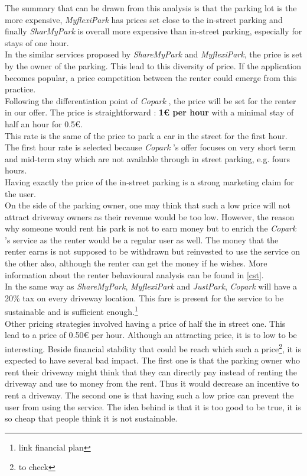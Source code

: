 \documentclass[12pt,a4paper,oneside]{book}
\newcommand{\bp}{\textit{Copark }}
\begin{document}
The summary that can be drawn from this analysis is that the parking lot is the more expensive, \textit{MyflexiPark} has prices set close to the in-street parking and finally \textit{SharMyPark} is overall more expensive than in-street parking, especially for stays of one hour.\\

In the similar services proposed by \textit{ShareMyPark} and \textit{MyflexiPark}, the price is set by the owner of the parking. This lead to this diversity of price. If the application becomes popular, a price competition between the renter could emerge from this practice.\\

Following the differentiation point of \bp, the price will be set for the renter in our offer. The price is straightforward : \textbf{1\euro{} per hour} with a minimal stay of half an hour for 0.5\euro{}.\\
This rate is the same of the price to park a car in the street for the first hour. The first hour rate is selected because \bp's offer focuses on very short term and mid-term stay which are not available through in street parking, e.g. fours hours.\\
Having exactly the price of the in-street parking is a strong marketing claim for the user.\\

On the side of the parking owner, one may think that such a low price will not attract driveway owners as their revenue would be too low. However, the reason why someone would rent his park is not to earn money but to enrich the \bp's service as the renter would be a regular user as well. The money that the renter earns is not supposed to be withdrawn but reinvested to use the service on the other also, although the renter can get the money if he wishes. More information about the renter behavioural analysis can be found in \autoref{cst}.\\

In the same way as \textit{ShareMyPark}, \textit{MyflexiPark} and \textit{JustPark}, \bp will have a 20\% tax on every driveway location. This fare is present for the service to be sustainable and is sufficient enough.\footnote{link financial plan}\\

Other pricing strategies involved having a price of half the in street one. This lead to a price of 0.50\euro{} per hour. Although an attracting price, it is to low to be interesting. Beside financial stability that could be reach which such a price\footnote{to check}, it is expected to have several bad impact. The first one is that the parking owner who rent their driveway might think that they can directly pay instead of renting the driveway and use to money from the rent. Thus it would decrease an incentive to rent a driveway. The second one is that having such a low price can prevent the user from using the service. The idea behind is that it is too good to be true, it is so cheap that people think it is not sustainable.\\
\end{document}
